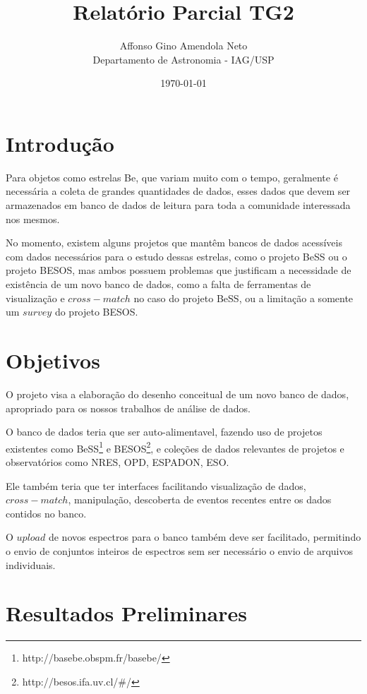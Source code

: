 \documentclass[a4paper,dvipsnames,twocolumn]{article}
\begin{document}
\title{Relatório Parcial TG2}
\author{Affonso Gino Amendola Neto\\
Departamento de Astronomia - IAG/USP}
\date{\today}


\maketitle
\section{Introdução}

Para objetos como estrelas Be, que variam muito com o tempo, geralmente é necessária a coleta de grandes quantidades de dados, esses dados que devem ser armazenados em banco de dados de leitura para toda a comunidade interessada nos mesmos.

No momento, existem alguns projetos que mantêm bancos de dados acessíveis com dados necessários para o estudo dessas estrelas, como o projeto BeSS ou o projeto BESOS, mas ambos possuem problemas que justificam a necessidade de existência de um novo banco de dados, como a falta de ferramentas de visualização e $cross-match$ no caso do projeto BeSS, ou a limitação a somente um $survey$ do projeto BESOS.

\section{Objetivos}

O projeto visa a elaboração do desenho conceitual de um novo banco de dados, apropriado para os nossos trabalhos de análise de dados.

O banco de dados teria que ser auto-alimentavel, fazendo uso de projetos existentes como BeSS\footnote{http://basebe.obspm.fr/basebe/} e BESOS\footnote{http://besos.ifa.uv.cl/\#/}, e coleções de dados relevantes de projetos e observatórios como NRES, OPD, ESPADON, ESO.

Ele também teria que ter interfaces facilitando visualização de dados, $cross-match$, manipulação, descoberta de eventos recentes entre os dados contidos no banco.

O $upload$ de novos espectros para o banco também deve ser facilitado, permitindo o envio de conjuntos inteiros de espectros sem ser necessário o envio de arquivos individuais.

\section{Resultados Preliminares}
\end{document}
